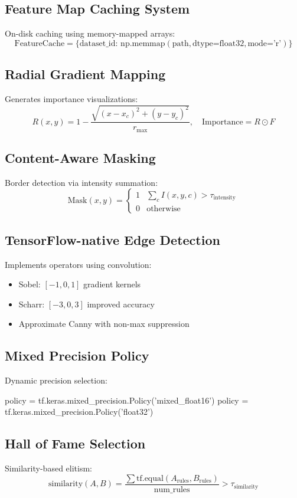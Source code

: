 \documentclass[runningheads]{llncs}
\begin{document}
\subsection{Feature Map Caching System}
On-disk caching using memory-mapped arrays:
\[
\text{FeatureCache} = \{ \text{dataset\_id: } \text{np.memmap}(\text{path}, \text{dtype=float32}, \text{mode='r'}) \}
\]

\subsection{Radial Gradient Mapping}
Generates importance visualizations:
\[
R(x,y) = 1 - \frac{\sqrt{(x-x_c)^2 + (y-y_c)^2}}{r_{\max}}, \quad \text{Importance} = R \odot F
\]

\subsection{Content-Aware Masking}
Border detection via intensity summation:
\[
\text{Mask}(x,y) = \begin{cases} 
      1 & \sum_{c} I(x,y,c) > \tau_{\text{intensity}} \\
      0 & \text{otherwise}
   \end{cases}
\]

\subsection{TensorFlow-native Edge Detection}
Implements operators using convolution:
\begin{itemize}
    \item Sobel: $[-1, 0, 1]$ gradient kernels
    \item Scharr: $[-3, 0, 3]$ improved accuracy
    \item Approximate Canny with non-max suppression
\end{itemize}

\subsection{Mixed Precision Policy}
Dynamic precision selection:
\begin{algorithmic}
    \State policy = tf.keras.mixed\_precision.Policy('mixed\_float16')
\Else
    \State policy = tf.keras.mixed\_precision.Policy('float32')
\EndIf
\end{algorithmic}

\subsection{Hall of Fame Selection}
Similarity-based elitism:
\[
\text{similarity}(A,B) = \frac{\sum \text{tf.equal}(A_{\text{rules}}, B_{\text{rules}})}{\text{num\_rules}} > \tau_{\text{similarity}}
\]
\end{document}
